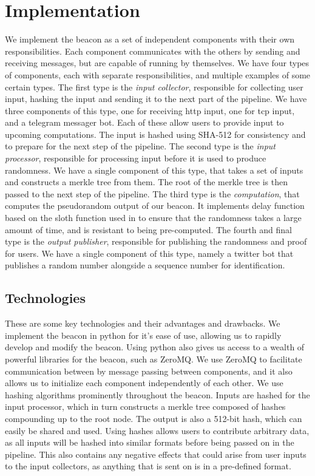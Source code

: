 \section{Implementation}
\label{sec:implementation}
We implement the beacon as  a set of independent components with their own responsibilities. Each component communicates with the others by sending and receiving messages, but are capable of running by themselves. We have four types of components, each with separate responsibilities, and multiple examples of some certain types. 
The first type is the \emph{input collector}, responsible for collecting user input, hashing the input and sending it to the next part of the pipeline. We have three components of this type, one for receiving http input, one for tcp input, and a telegram messager bot. Each of these allow users to provide input to upcoming computations. The input is hashed using SHA-512 for consistency and to prepare for the next step of the pipeline. 
The second type is the \emph{input processor}, responsible for processing input before it is used to produce randomness. We have a single component of this type, that takes a set of inputs and constructs a merkle tree from them. The root of the merkle tree is then passed to the next step of the pipeline. 
The third type is the \emph{computation}, that computes the pseudorandom output of our beacon. It implements delay function based on the sloth function used in \cite{randomzoo} to ensure that the randomness takes a large amount of time, and is resistant to being pre-computed. 
The fourth and final type is the \emph{output publisher}, responsible for publishing the randomness and proof for users. We have a single component of this type, namely a twitter bot that publishes a random number alongside a sequence number for identification. 
\subsection{Technologies}
\label{sub:technologies}
These are some key technologies and their advantages and drawbacks.
We implement the beacon in python for it's ease of use, allowing us to rapidly develop and modify the beacon. Using python also gives us access to a wealth of powerful libraries for the beacon, such as ZeroMQ. We use ZeroMQ to facilitate communication between by message passing between components, and it also allows us to initialize each component independently of each other. 
We use hashing algorithms prominently throughout the beacon. Inputs are hashed for the input processor, which in turn constructs a merkle tree composed of hashes compounding up to the root node. The output is also a 512-bit hash, which can easily be shared and used. Using hashes allows users to contribute arbitrary data, as all inputs will be hashed into similar formats before being passed on in the pipeline. This also contains any negative effects that could arise from user inputs to the input collectors, as anything that is sent on is in a pre-defined format. 